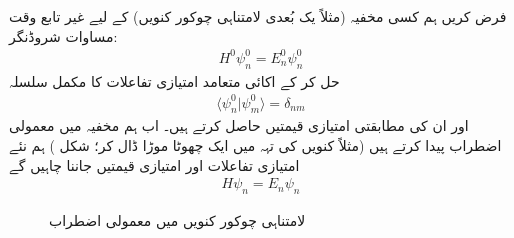
فرض کریں ہم کسی مخفیہ (مثلاً یک بُعدی لامتناہی چوکور کنویں) کے لیے غیر تابع وقت مساوات شروڈنگر:
\begin{align}\label{مساوات_اضطراب_پہلی}
H^0\psi_n^0=E_n^0\psi_n^0
\end{align}
حل کر کے اکائی متعامد امتیازی تفاعلات  کا مکمل سلسلہ
\begin{align}
\langle \psi_n^0 | \psi_m^0 \rangle = \delta_{nm}
\end{align}
اور ان کی مطابقتی امتیازی قیمتیں  حاصل کرتے ہیں۔ اب ہم مخفیہ میں معمولی اضطراب پیدا کرتے ہیں (مثلاً کنویں کی تہہ میں ایک چھوٹا موڑا ڈال کر؛ شکل ) ہم نئے امتیازی تفاعلات اور امتیازی قیمتیں جاننا چاہیں گے
\begin{align}\label{مساوات_اضطراب_بنیادی}
H\psi_n = E_n\psi_n
\end{align}
%
\begin{figure}
\centering
{}
\caption{لامتناہی چوکور کنویں میں معمولی اضطراب}
\label{شکل_غیر_تابع_اضطراب_چکور_معمولی}
\end{figure}

